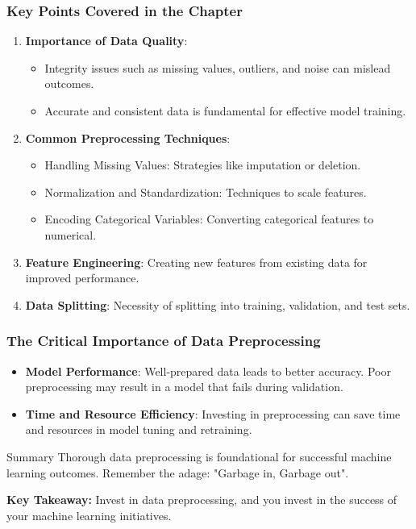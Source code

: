 \documentclass[aspectratio=169]{beamer}
\begin{document}
\begin{frame}[fragile]
    \frametitle{Key Points Covered in the Chapter}
    \begin{enumerate}
        \item \textbf{Importance of Data Quality}:
        \begin{itemize}
            \item Integrity issues such as missing values, outliers, and noise can mislead outcomes.
            \item Accurate and consistent data is fundamental for effective model training.
        \end{itemize}
        \item \textbf{Common Preprocessing Techniques}:
        \begin{itemize}
            \item Handling Missing Values: Strategies like imputation or deletion.
            \item Normalization and Standardization: Techniques to scale features.
            \item Encoding Categorical Variables: Converting categorical features to numerical.
        \end{itemize}
        \item \textbf{Feature Engineering}: Creating new features from existing data for improved performance.
        \item \textbf{Data Splitting}: Necessity of splitting into training, validation, and test sets.
    \end{enumerate}
\end{frame}

\begin{frame}[fragile]
    \frametitle{The Critical Importance of Data Preprocessing}
    \begin{itemize}
        \item \textbf{Model Performance}: Well-prepared data leads to better accuracy. Poor preprocessing may result in a model that fails during validation.
        \item \textbf{Time and Resource Efficiency}: Investing in preprocessing can save time and resources in model tuning and retraining.
    \end{itemize}
    \begin{block}{Summary}
        Thorough data preprocessing is foundational for successful machine learning outcomes. Remember the adage: "Garbage in, Garbage out".
    \end{block}
    \textbf{Key Takeaway:} Invest in data preprocessing, and you invest in the success of your machine learning initiatives.
\end{frame}
\end{document}
